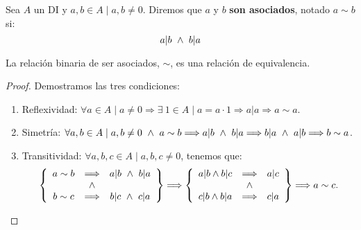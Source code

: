 \begin{definicion}[Asociados]
    Sea $A$ un DI y $a, b\in A \mid a,b \neq 0$. Diremos que $a$ y $b$ \textbf{son asociados}, notado $a\sim b$ si:
    $$a|b \ \land \  b|a$$
\end{definicion}

\begin{lema}
    La relación binaria de ser asociados, $\sim$, es una relación de equivalencia.
\end{lema}
\begin{proof} Demostramos las tres condiciones:
\begin{enumerate}
    \item Reflexividad: $\forall a \in A \mid a \neq 0 \Longrightarrow \exists \ 1 \in A \mid a = a \cdot 1 \Longrightarrow a|a \Longrightarrow a \sim a$.

    \item Simetría: $\forall a,b \in A \mid a,b \neq 0 \ \land \  a \sim b \Longrightarrow a|b \ \land \  b|a \Longrightarrow b|a \ \land \  a|b \Longrightarrow b \sim a$.

    \item Transitividad: $\forall a,b,c \in A \mid a,b,c \neq 0$, tenemos que:
    \begin{equation*}
        \left\{
        \begin{array}{ccc}
            a\sim b &\Longrightarrow & a|b \ \land \  b|a  \\ &\land& \\
            b\sim c &\Longrightarrow & b|c \ \land \  c|a
        \end{array}
        \right\}
        \Longrightarrow
        \left\{
        \begin{array}{ccc}
            a|b \land b|c &\Longrightarrow & a|c  \\ &\land& \\
            c|b \land b|a &\Longrightarrow &c|a
        \end{array}
        \right\} \Longrightarrow a\sim c.
    \end{equation*}
\end{enumerate}
\end{proof}

